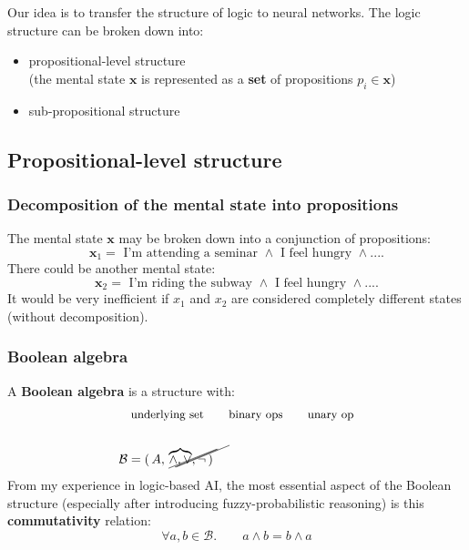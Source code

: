 \documentclass[orivec]{llncs}
\newcommand{\vect}[1]{\boldsymbol{#1}}
\newcommand{\tikzmark}[1]{\tikz[overlay,remember picture] \node (#1) {};}
\begin{document}
Our idea is to transfer the structure of logic to neural networks.  The logic structure can be broken down into:
\begin{itemize}
\item propositional-level structure \\
(the mental state $\vect{x}$ is represented as a \textbf{set} of propositions $p_i \in \vect{x}$)
\item sub-propositional structure
\end{itemize}

\subsection{Propositional-level structure}

\subsubsection{Decomposition of the mental state into propositions}

The mental state $\vect{x}$ may be broken down into a conjunction of propositions:
\begin{equation}
\vect{x}_1 = \mbox{ I'm attending a seminar } \wedge \mbox{ I feel hungry } \wedge ....
\end{equation}
There could be another mental state:
\begin{equation}
\vect{x}_2 = \mbox{ I'm riding the subway } \wedge \mbox{ I feel hungry } \wedge ....
\end{equation}
It would be very inefficient if $x_1$ and $x_2$ are considered completely different states (without decomposition).

\subsubsection{Boolean algebra}

A \textbf{Boolean algebra} is a structure with:
\begin{eqnarray}
& \mbox{\footnotesize underlying set} \tikzmark{underSet} \quad \mbox{\footnotesize binary ops} \tikzmark{binaryOps} \quad \mbox{\footnotesize unary op} \tikzmark{unaryOp} \nonumber\\
\nonumber \\
& \mathcal{B} = ( \, \tikzmark{UnderSet} A, \tikzmark{BinaryOps} \overbrace{\wedge, \vee}, \tikzmark{UnaryOp} \neg \, )
\begin{tikzpicture}[overlay,remember picture]
  \draw (underSet.center) +(-35pt,-4pt) -- ([shift={(3pt,11pt)}]UnderSet.center);
  \draw (binaryOps.center) +(-29pt,-3pt) -- ([shift={(13pt,14pt)}]BinaryOps.center);
  \draw (unaryOp.center) +(-30pt,-3pt) -- ([shift={(4pt,11pt)}]UnaryOp.center);
\end{tikzpicture}
\end{eqnarray}
From my experience in logic-based AI, the most essential aspect of the Boolean structure (especially after introducing fuzzy-probabilistic reasoning) is this \textbf{commutativity} relation:
\begin{equation}
\forall a,b \in \mathcal{B}.  \quad \quad a \wedge b = b \wedge a
\end{equation}
\end{document}
